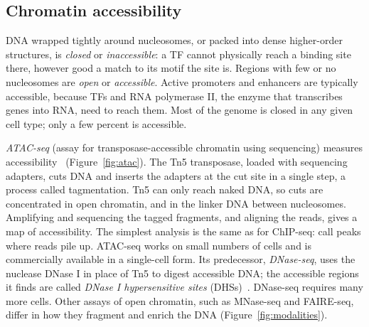 \subsection{Chromatin accessibility}

DNA wrapped tightly around nucleosomes, or packed into dense higher-order structures, is \emph{closed} or \emph{inaccessible}: a TF cannot physically reach a binding site there, however good a match to its motif the site is. Regions with few or no nucleosomes are \emph{open} or \emph{accessible}. Active promoters and enhancers are typically accessible, because TFs and RNA polymerase II, the enzyme that transcribes genes into RNA, need to reach them. Most of the genome is closed in any given cell type; only a few percent is accessible.

\emph{ATAC-seq} (assay for transposase-accessible chromatin using sequencing) measures accessibility~\citep{buenrostro2013} (Figure~\ref{fig:atac}). The Tn5 transposase, loaded with sequencing adapters, cuts DNA and inserts the adapters at the cut site in a single step, a process called tagmentation. Tn5 can only reach naked DNA, so cuts are concentrated in open chromatin, and in the linker DNA between nucleosomes. Amplifying and sequencing the tagged fragments, and aligning the reads, gives a map of accessibility. The simplest analysis is the same as for ChIP-seq: call peaks where reads pile up. ATAC-seq works on small numbers of cells and is commercially available in a single-cell form. Its predecessor, \emph{DNase-seq}, uses the nuclease DNase I in place of Tn5 to digest accessible DNA; the accessible regions it finds are called \emph{DNase I hypersensitive sites} (DHSs)~\citep{boyle2008}. DNase-seq requires many more cells. Other assays of open chromatin, such as MNase-seq and FAIRE-seq, differ in how they fragment and enrich the DNA (Figure~\ref{fig:modalities}).

